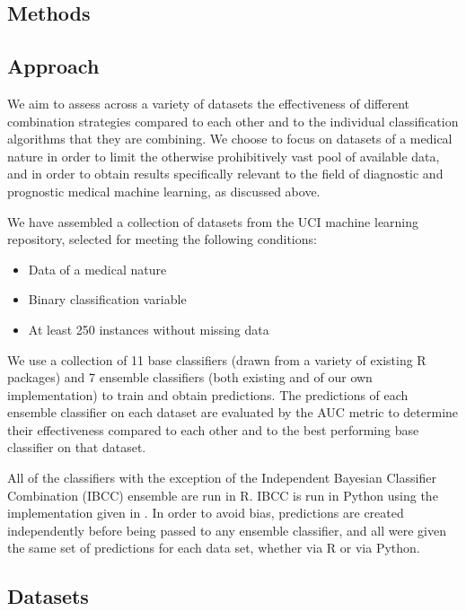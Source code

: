 \documentclass{bioinfo}
\begin{document}
\begin{methods}
\vspace{-0.8cm}
\section{Methods}

\subsection{Approach}

We aim to assess across a variety of datasets the effectiveness of different combination strategies compared to each other and to the individual classification algorithms that they are combining. We choose to focus on datasets of a medical nature in order to limit the otherwise prohibitively vast pool of available data, and in order to obtain results specifically relevant to the field of diagnostic and prognostic medical machine learning, as discussed above.

We have assembled a collection of datasets from the UCI machine learning repository, selected for meeting the following conditions:

\begin{itemize}
\item Data of a medical nature
\item Binary classification variable
\item At least 250 instances without missing data
\end{itemize}

\noindent
We use a collection of 11 base classifiers (drawn from a variety of existing R packages) and 7 ensemble classifiers (both existing and of our own implementation) to train and obtain predictions. The predictions of each ensemble classifier on each dataset are evaluated by the AUC metric to determine their effectiveness compared to each other and to the best performing base classifier on that dataset.

All of the classifiers with the exception of the Independent Bayesian Classifier Combination (IBCC) ensemble are run in R. IBCC is run in Python using the implementation given in \cite{Simpson13}. In order to avoid bias, predictions are created independently before being passed to any ensemble classifier, and all were given the same set of predictions for each data set, whether via R or via Python.


\subsection{Datasets}


\end{methods}
\end{document}
